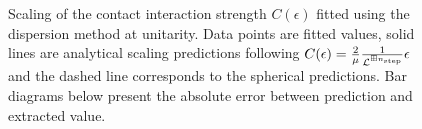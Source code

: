 \begin{figure}
    
    \caption{
        Scaling of the contact interaction strength $C(\epsilon)$ fitted using the dispersion method at unitarity.
        Data points are fitted values, solid lines are analytical scaling predictions following $C(\epsilon) = \frac{2}{\mu} \frac{1}{\mathcal L^{\boxplus n_\mathrm{step}}} \epsilon $ and the dashed line corresponds to the spherical predictions.
        Bar diagrams below present the absolute error between prediction and extracted value.
    }
    \label{fig:dispersion running of strength}
\end{figure}
